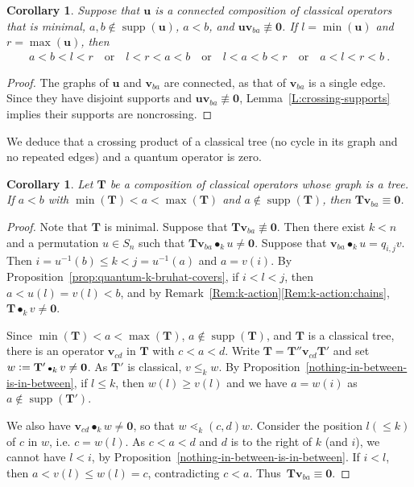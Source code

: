 \documentclass[11pt]{article}
\newtheorem{corollary}[theo]{Corollary}
\theoremstyle{definition}
\numberwithin{equation}{section}
\newcommand{\qu}{{\mathbf u}}
\newcommand{\qv}{{\mathbf v}}
\newcommand{\bzero}{{\mathbf 0}}
\DeclareMathOperator{\supp}{supp}
\DeclareMathOperator{\kactionop}{{\scriptstyle \bullet}}
\newcommand{\kaction}[1][k]{\kactionop_{#1}}
\def\T{\mathbf{T}}
\begin{document}
\begin{corollary}
    \label{corollary-classical-product-times-quantum}
    Suppose that $\qu$ is a connected composition of classical operators that is minimal,
    $a, b \notin \supp(\qu)$, $a<b$, and $\qu \qv_{ba} \not\equiv \bzero$.
    If $l = \min(\qu)$ and $r = \max(\qu)$, then
    \begin{gather*}
        a < b < l < r
        \quad\text{or}\quad
        l < r < a < b
        \quad\text{or}\quad
        l < a < b < r
        \quad\text{or}\quad
        a < l < r < b\ .
    \end{gather*}
\end{corollary}

\begin{proof}
    The graphs of $\qu$ and $\qv_{ba}$ are connected, as that of $\qv_{ba}$ is a single edge.
    Since they have disjoint supports and $\qu \qv_{ba} \not\equiv \bzero$, Lemma~\ref{L:crossing-supports}
    implies their supports are noncrossing.
\end{proof}

We deduce that a crossing product of a classical tree (no cycle in its graph and no repeated edges) and
a quantum operator is zero.

\begin{corollary}
    \label{T*vq=0}
    Let $\T$ be a composition of classical operators whose graph is a tree.
    If $a<b$ with $\min(\T) < a < \max(\T)$
    and $a \notin \supp(\T)$, then $\T \qv_{ba} \equiv \bzero$.
\end{corollary}

\begin{proof}
  Note that $\T$ is minimal.
  Suppose that  $\T \qv_{ba} \not\equiv \bzero$.
  Then there exist $k<n$ and a permutation $u\in S_n$ such that $\T\qv_{ba}\kaction u\neq\bzero$.
  Suppose that $\qv_{ba}\kaction u = q_{i, j} v$.
  Then $i=u^{-1}(b)\leq k <j=u^{-1}(a)$ and $a=v(i)$.
  By Proposition~\ref{prop:quantum-k-bruhat-covers}, if $i<l<j$, then $a<u(l)=v(l)<b$, and 
  by  Remark~\ref{Rem:k-action}\ref{Rem:k-action:chains}, $\T\kaction v\neq\bzero$.

  Since  $\min(\T)<a<\max(\T)$, $a\not\in\supp(\T)$, and $\T$ is a classical tree, there is an operator $\qv_{cd}$ in $\T$ with $c<a<d$.
  Write $\T=\T'' \qv_{cd} \T'$ and set $w \vcentcolon= \T' \kaction v\neq \bzero$.
  As $\T'$ is classical, $v\leq_k w$.
  By Proposition~\ref{nothing-in-between-is-in-between},
  if $l\leq k$, then $w(l)\geq v(l)$ and we have $a=w(i)$ as $a\not\in\supp(\T')$.

  We also have $\qv_{cd}\kaction w\neq\bzero$, so that $w\lessdot_k (c,d)w$.
  Consider the position $l(\leq k)$ of $c$ in $w$, i.e. $c=w(l)$.
  As $c<a<d$ and $d$ is to the right of $k$ (and $i$), we cannot have $l<i$, by Proposition~\ref{nothing-in-between-is-in-between}.
  If $i<l$, then $a<v(l)\leq w(l)=c$, contradicting $c<a$.
  Thus~$\T \qv_{ba}\equiv \bzero$.
\end{proof}
\end{document}
